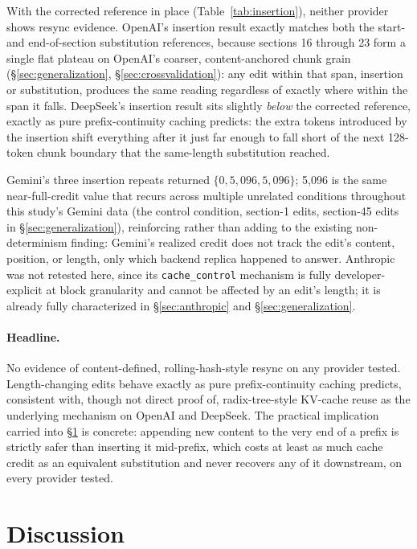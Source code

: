 \documentclass[11pt]{article}
\newcommand{\code}[1]{\texttt{#1}}
\begin{document}
With the corrected reference in place (Table~\ref{tab:insertion}), neither
provider shows resync evidence. OpenAI's insertion result exactly matches
both the start- and end-of-section substitution references, because
sections 16 through 23 form a single flat plateau on OpenAI's coarser,
content-anchored chunk grain (\S\ref{sec:generalization},
\S\ref{sec:crossvalidation}): any edit within that span, insertion or
substitution, produces the same reading regardless of exactly where within
the span it falls. DeepSeek's insertion result sits slightly \emph{below}
the corrected reference, exactly as pure prefix-continuity caching
predicts: the extra tokens introduced by the insertion shift everything
after it just far enough to fall short of the next 128-token chunk
boundary that the same-length substitution reached.

Gemini's three insertion repeats returned $\{0, 5{,}096, 5{,}096\}$; 5{,}096
is the same near-full-credit value that recurs across multiple unrelated
conditions throughout this study's Gemini data (the control condition,
section-1 edits, section-45 edits in \S\ref{sec:generalization}),
reinforcing rather than adding to the existing non-determinism finding:
Gemini's realized credit does not track the edit's content, position, or
length, only which backend replica happened to answer. Anthropic was not
retested here, since its \code{cache\_control} mechanism is fully
developer-explicit at block granularity and cannot be affected by an
edit's length; it is already fully characterized in \S\ref{sec:anthropic}
and \S\ref{sec:generalization}.

\paragraph{Headline.} No evidence of content-defined, rolling-hash-style
resync on any provider tested. Length-changing edits behave exactly as
pure prefix-continuity caching predicts, consistent with, though not
direct proof of, radix-tree-style KV-cache reuse as the underlying
mechanism on OpenAI and DeepSeek. The practical implication carried into
\S\ref{sec:discussion} is concrete: appending new content to the very end
of a prefix is strictly safer than inserting it mid-prefix, which costs at
least as much cache credit as an equivalent substitution and never
recovers any of it downstream, on every provider tested.

\section{Discussion}
\label{sec:discussion}
\end{document}
